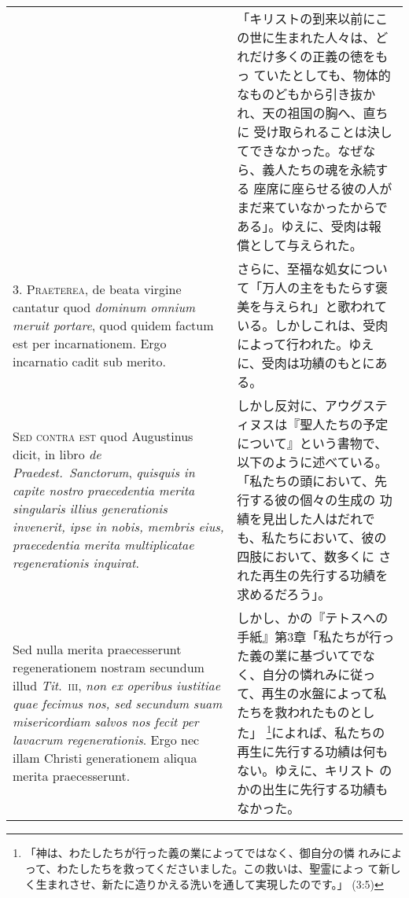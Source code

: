 \documentclass[10pt]{jsarticle} %
\begin{document}
\begin{longtable}{p{21em}p{21em}}
&

「キリストの到来以前にこの世に生まれた人々は、どれだけ多くの正義の徳をもっ
 ていたとしても、物体的なものどもから引き抜かれ、天の祖国の胸へ、直ちに
 受け取られることは決してできなかった。なぜなら、義人たちの魂を永続する
 座席に座らせる彼の人がまだ来ていなかったからである」。ゆえに、受肉は報
 償として与えられた。


\\



3. {\scshape Praeterea}, de beata virgine cantatur quod {\itshape dominum omnium meruit portare},
quod quidem factum est per incarnationem. Ergo incarnatio cadit sub
merito.


&

さらに、至福な処女について「万人の主をもたらす褒美を与えられ」と歌われて
 いる。しかしこれは、受肉によって行われた。ゆえに、受肉は功績のもとにあ
 る。


\\



{\scshape Sed contra est} quod Augustinus dicit, in libro {\itshape de Praedest.~Sanctorum},
{\itshape quisquis in capite nostro praecedentia merita singularis illius
generationis invenerit, ipse in nobis, membris eius, praecedentia merita
multiplicatae regenerationis inquirat}. 


&

しかし反対に、アウグスティヌスは『聖人たちの予定について』という書物で、
 以下のように述べている。「私たちの頭において、先行する彼の個々の生成の
 功績を見出した人はだれでも、私たちにおいて、彼の四肢において、数多くに
 された再生の先行する功績を求めるだろう」。


\\


Sed nulla merita praecesserunt
regenerationem nostram secundum illud {\itshape Tit}.~{\scshape iii}, {\itshape non ex operibus
iustitiae quae fecimus nos, sed secundum suam misericordiam salvos nos
fecit per lavacrum regenerationis}. Ergo nec illam Christi generationem
aliqua merita praecesserunt.


&

しかし、かの『テトスへの手紙』第3章「私たちが行った義の業に基づいてでな
 く、自分の憐れみに従って、再生の水盤によって私たちを救われたものとした」
 \footnote{「神は、わたしたちが行った義の業によってではなく、御自分の憐
 れみによって、わたしたちを救ってくださいました。この救いは、聖霊によっ
 て新しく生まれさせ、新たに造りかえる洗いを通して実現したのです。」
 (3:5)}によれば、私たちの再生に先行する功績は何もない。ゆえに、キリスト
 のかの出生に先行する功績もなかった。


\end{longtable}
\end{document}
